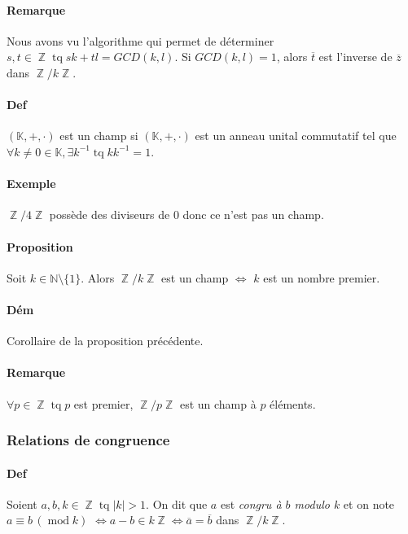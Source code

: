 \documentclass{article}
\DeclareMathOperator{\tq}{\text{ tq }}
\DeclareMathOperator{\Z}{\mathbb Z}
\DeclareMathOperator{\modulo}{mod}
\newcommand{\cmod}[1]{\, (\modulo #1)}
\begin{document}
			\paragraph{Remarque} Nous avons vu l'algorithme qui permet de déterminer $s, t \in\Z \tq sk + tl = GCD(k, l)$. Si $GCD(k, l) = 1$, alors $\overline t$ est
			l'inverse de $\overline z$ dans $\Z / k\Z$.
			
			\paragraph{Def} $(\mathbb K, +, \cdot)$ est un champ si $(\mathbb K, +,\cdot)$ est un anneau unital commutatif tel que $\forall k \neq 0 \in \mathbb K,
			\exists k^{-1}\tq kk^{-1} = 1$.
			
			\paragraph{Exemple} $\Z/4\Z$ possède des diviseurs de $0$ donc ce n'est pas un champ.
			
			\paragraph{Proposition} Soit $k \in \mathbb N \setminus \{1\}$. Alors $\Z/k\Z$ est un champ $\iff$ $k$ est un nombre premier.
			
			\paragraph{Dém} Corollaire de la proposition précédente.
			
			\paragraph{Remarque} $\forall p \in \Z \tq p$ est premier, $\Z/p\Z$ est un champ à $p$ éléments.
			
			\subsubsection{Relations de congruence}
			
			\paragraph{Def} Soient $a, b, k\in \Z \tq |k| > 1$. On dit que $a$ est \textit{congru à $b$ modulo $k$} et on note $a \equiv b \cmod k$ $\iff a-b \in k\Z \iff
			\overline a = \overline b$ dans $\Z/k\Z$.
			
\end{document}
